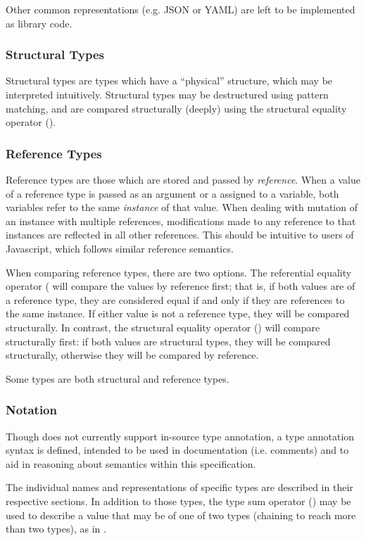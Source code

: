 Other common representations (e.g. JSON or YAML) are left
to be implemented as library code.

\subsubsection{Structural Types}

Structural types are types which have a ``physical'' structure, which may be
interpreted intuitively. Structural types may be destructured using pattern
matching, and are compared structurally (deeply) using the structural equality
operator ().

\subsubsection{Reference Types}

Reference types are those which are stored and passed by \emph{reference}. When
a value of a reference type is passed as an argument or a assigned to a variable, both
variables refer to the same \emph{instance} of that value. When dealing with
mutation of an instance with multiple references, modifications made to any
reference to that instances are reflected in all other references. This should be
intuitive to users of Javascript, which follows similar reference semantics.

When comparing reference types, there are two options. The referential equality
operator (\op{==)} will compare the values by reference first; that is, if
both values are of a reference type, they are considered equal if and only
if they are references to the same instance. If either value is not a reference
type, they will be compared structurally. In contrast, the structural equality
operator () will compare structurally first: if both values are structural
types, they will be compared structurally, otherwise they will be compared by
reference.

Some types are both structural and reference types.

\subsubsection{Notation}

Though \Trilogy{} does not currently support in-source type annotation, a
type annotation syntax is defined, intended to be used in documentation
(i.e. comments) and to aid in reasoning about semantics within this specification.

The individual names and representations of specific types are described
in their respective sections. In addition to those types, the type sum operator
(\op{|}) may be used to describe a value that may be of one of two types (chaining
to reach more than two types), as in .






